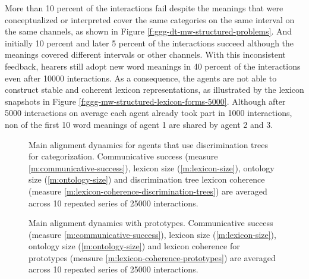 More than 10 percent of the interactions fail despite the meanings
that were conceptualized or interpreted cover the same categories on
the same interval on the same channels, as shown in Figure
\ref{f:ggg-dt-mw-structured-problems}. And initially 10 percent and
later 5 percent of the interactions succeed although the meanings
covered different intervals or other channels. With this inconsistent
feedback, hearers still adopt new word meanings in 40 percent of the
interactions even after 10000 interactions.  As a consequence, the
agents are not able to construct stable and coherent lexicon
representations, as illustrated by the lexicon snapshots in Figure
\ref{f:ggg-mw-structured-lexicon-forms-5000}. Although after 5000
interactions on average each agent already took part in 1000
interactions, non of the first 10 word meanings of agent 1 are shared
by agent 2 and 3.



\startfiguregroup
  
\begin{figure}[t]
  \caption{Main alignment dynamics for agents that use discrimination
    trees for categorization. Communicative success (measure
    \ref{m:communicative-success}), lexicon size
    (\ref{m:lexicon-size}), ontology size (\ref{m:ontology-size}) and
    discrimination tree lexicon coherence (measure
    \ref{m:lexicon-coherence-discrimination-trees}) are averaged
    across 10 repeated series of 25000 interactions.}
  \label{f:ggg-dt-mw-structured-success+lexicon+ontology}
\end{figure}


\begin{figure}[t]
  \caption{Main alignment dynamics with prototypes. Communicative
    success (measure \ref{m:communicative-success}), lexicon size
    (\ref{m:lexicon-size}), ontology size (\ref{m:ontology-size}) and
    lexicon coherence for prototypes (measure
    \ref{m:lexicon-coherence-prototypes}) are averaged across 10
    repeated series of 25000 interactions.}
  \label{f:ggg-p-mw-structured-success+lexicon+ontology}
\end{figure}

\stopfiguregroup


